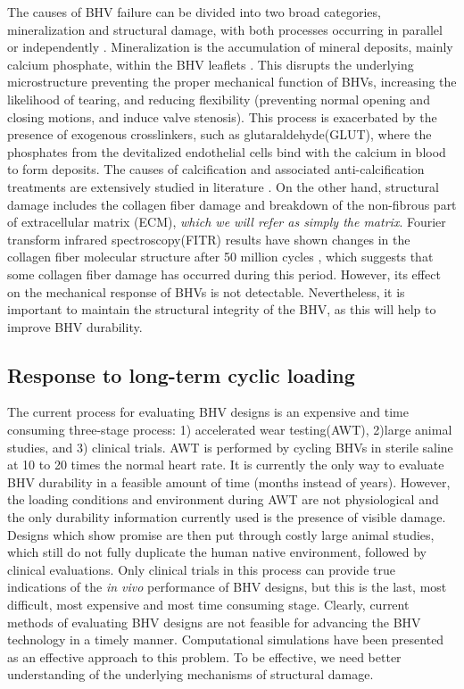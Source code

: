 	The causes of BHV failure can be divided into two broad categories, mineralization and structural damage, with both processes occurring in parallel or independently \cite{sacks_collagen_2002}. 
	Mineralization is the accumulation of mineral deposits, mainly calcium phosphate, within the BHV leaflets \cite{schoen_calcification_2005}. 
	This disrupts the underlying microstructure preventing the proper mechanical function of BHVs, increasing the likelihood of tearing, and reducing flexibility (preventing normal opening and closing motions, and induce valve stenosis). 
	This process is exacerbated by the presence of exogenous crosslinkers, such as glutaraldehyde(GLUT), where the phosphates from the devitalized endothelial cells bind with the calcium in blood to form deposits. 
	The causes of calcification and associated anti-calcification treatments are extensively studied in literature \cite{park_novel_1997, isenburg_tannic_2005, vyavahare_prevention_1997}.
	On the other hand, structural damage includes the collagen fiber damage and breakdown of the non-fibrous part of extracellular matrix (ECM), \emph{which we will refer as simply the matrix}.
	Fourier transform infrared spectroscopy(FITR) results have shown changes in the collagen fiber molecular structure after 50 million cycles \cite{sun_response_2004}, which suggests that some collagen fiber damage has occurred during this period. 
	However, its effect on the mechanical response of BHVs is not detectable. 
	Nevertheless, it is important to maintain the structural integrity of the BHV, as this will help to improve BHV durability. 
	

	
\subsection{Response to long-term cyclic loading}

	The current process for evaluating BHV designs is an expensive and time consuming three-stage process: 1) accelerated wear testing(AWT), 2)large animal studies, and 3) clinical trials.
	AWT is performed by cycling BHVs in sterile saline at 10 to 20 times the normal heart rate. 
	It is currently the only way to evaluate BHV durability in a feasible amount of time (months instead of years). 
	However, the loading conditions and environment during AWT are not physiological and the only durability information currently used is the presence of visible damage. 
	Designs which show promise are then put through costly large animal studies, which still do not fully duplicate the human native environment, followed by clinical evaluations. 
	Only clinical trials in this process can provide true indications of the \textit{in vivo} performance of BHV designs, but this is the last, most difficult, most expensive and most time consuming stage. 
	Clearly, current methods of evaluating BHV designs are not feasible for advancing the BHV technology in a timely manner. 
	Computational simulations have been presented as an effective approach to this problem\cite{soares_biomechanical_2016}. 
	To be effective, we need better understanding of the underlying mechanisms of structural damage. 
	

